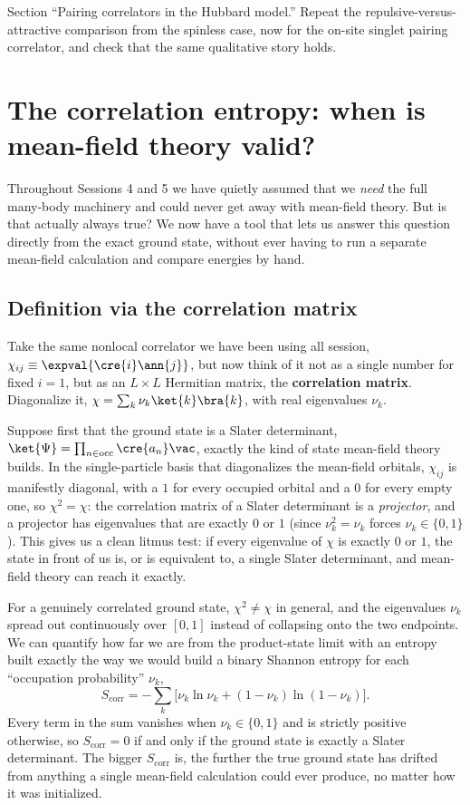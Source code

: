 \documentclass[all_sessions.tex]{subfiles}
\begin{document}
\begin{notebook}
Section ``Pairing correlators in the Hubbard model.'' Repeat the repulsive-versus-attractive
comparison from the spinless case, now for the on-site singlet pairing correlator, and check that
the same qualitative story holds.
\end{notebook}

\section{The correlation entropy: when is mean-field theory valid?}
\label{sec:corrent}
Throughout Sessions 4 and 5 we have quietly assumed that we \emph{need} the full many-body machinery
and could never get away with mean-field theory. But is that actually always true? We now have a
tool that lets us answer this question directly from the exact ground state, without ever having to
run a separate mean-field calculation and compare energies by hand.

\subsection{Definition via the correlation matrix}
Take the same nonlocal correlator we have been using all session, $\chi_{ij} \equiv
\expval{\cre{i}\ann{j}}$, but now think of it not as a single number for fixed $i=1$, but as an
$L\times L$ Hermitian matrix, the \textbf{correlation matrix}. Diagonalize it,
$\chi = \sum_k \nu_k \ket{k}\bra{k}$, with real eigenvalues $\nu_k$.

Suppose first that the ground state is a Slater determinant, $\ket{\Psi} = \prod_{n\in\mathrm{occ}}
\cre{a_n}\vac$, exactly the kind of state mean-field theory builds. In the single-particle basis
that diagonalizes the mean-field orbitals, $\chi_{ij}$ is manifestly diagonal, with a $1$ for every
occupied orbital and a $0$ for every empty one, so $\chi^2=\chi$: the correlation matrix of a Slater
determinant is a \emph{projector}, and a projector has eigenvalues that are exactly $0$ or $1$ (since
$\nu_k^2=\nu_k$ forces $\nu_k\in\{0,1\}$). This gives us a clean litmus test: if every eigenvalue of
$\chi$ is exactly $0$ or $1$, the state in front of us is, or is equivalent to, a single Slater
determinant, and mean-field theory can reach it exactly.

For a genuinely correlated ground state, $\chi^2\ne\chi$ in general, and the eigenvalues $\nu_k$
spread out continuously over $[0,1]$ instead of collapsing onto the two endpoints. We can quantify
how far we are from the product-state limit with an entropy built exactly the way we would build a
binary Shannon entropy for each ``occupation probability'' $\nu_k$,
\begin{equation}
  S_{\mathrm{corr}} = -\sum_k \Big[\nu_k\ln\nu_k + (1-\nu_k)\ln(1-\nu_k)\Big].
  \label{eq:corrent}
\end{equation}
Every term in the sum vanishes when $\nu_k\in\{0,1\}$ and is strictly positive otherwise, so
$S_{\mathrm{corr}}=0$ if and only if the ground state is exactly a Slater determinant. The bigger
$S_{\mathrm{corr}}$ is, the further the true ground state has drifted from anything a single
mean-field calculation could ever produce, no matter how it was initialized.
\end{document}
